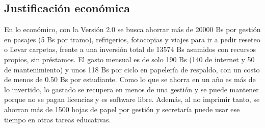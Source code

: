 \subsection{Justificación económica}

En lo económico, con la Versión 2.0 se busca ahorrar más de 20000 Bs por gestión en pasajes (5 Bs por tramo), refrigerios, fotocopias y viajes para ir a pedir reseteo o llevar carpetas, frente a una inversión total de 13574 Bs asumidos con recursos propios, sin préstamos. El gasto mensual es de solo 190 Bs (140 de internet y 50 de mantenimiento) y unos 118 Bs por ciclo en papelería de respaldo, con un costo de menos de 0.50 Bs por estudiante. Como lo que se ahorra en un año es más de lo invertido, lo gastado se recupera en menos de una gestión y se puede mantener porque no se pagan licencias y es software libre. Además, al no imprimir tanto, se ahorran más de 1500 hojas de papel por gestión y secretaría puede usar ese tiempo en otras tareas educativas.
